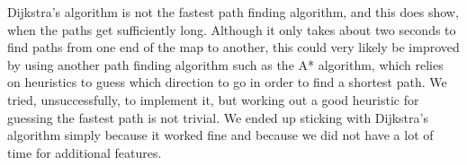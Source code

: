 Dijkstra's algorithm is not the fastest path finding algorithm, and this does show, when the paths get sufficiently long. Although it only takes about two seconds to find paths from one end of the map to another, this could very likely be improved by using another path finding algorithm such as the A* algorithm, which relies on heuristics to guess which direction to go in order to find a shortest path. We tried, unsuccessfully, to implement it, but working out a good heuristic for guessing the fastest path is not trivial. We ended up sticking with Dijkstra's algorithm simply because it worked fine and because we did not have a lot of time for additional features.